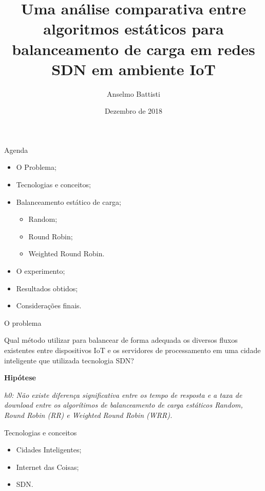 \documentclass{beamer}
\title[]{Uma análise comparativa entre algoritmos estáticos para balanceamento de carga em redes SDN em ambiente IoT}
\author{Anselmo Battisti}
\institute{Universidade Federal Fluminense}
\date{Dezembro de 2018}
\begin{document}
\begin{frame}
  \titlepage
\end{frame}


\begin{frame}{Agenda}
    \begin{itemize}
      \item O Problema;
      \item Tecnologias e conceitos;
      \item Balanceamento estático de carga;
        \begin{itemize}  
            \item Random;
            \item Round Robin;
            \item Weighted Round Robin.
        \end{itemize} 
      \item O experimento;
      \item Resultados obtidos;
      \item Considerações finais.
    \end{itemize}
\end{frame}

\begin{frame}{O problema}

    \begin{block}
      
      Qual método utilizar para balancear de forma adequada os diversos fluxos existentes entre dispositivos IoT e os servidores de processamento em uma cidade inteligente que utilizada tecnologia SDN?
      
    \end{block}

    \vspace{0.2in}
    \textbf{Hipótese}
    \vspace{0.2in}
    
    \textit{h0: Não existe diferença significativa entre os tempo de resposta e a taxa de download entre os algorítimos de balanceamento de carga estáticos Random, Round Robin (RR) e Weighted Round Robin (WRR).}
\end{frame}

\begin{frame}{Tecnologias e conceitos}

    \begin{itemize}
      \item Cidades Inteligentes;
      \item Internet das Coisas;
      \item SDN.
    \end{itemize}

\end{frame}
\end{document}
